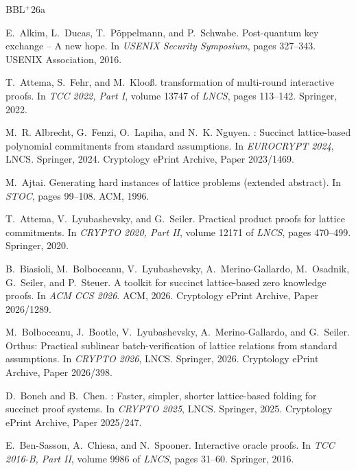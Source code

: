 \providecommand{\etalchar}[1]{$^{#1}$}
\begin{thebibliography}{BBL{\etalchar{+}}26a}
\small

E.~Alkim, L.~Ducas, T.~P{\"o}ppelmann, and P.~Schwabe.
\newblock Post-quantum key exchange -- A new hope.
\newblock In {\em USENIX Security Symposium}, pages 327--343. USENIX Association, 2016.

T.~Attema, S.~Fehr, and M.~Kloo{\ss}.
 transformation of multi-round interactive proofs.
\newblock In {\em TCC 2022, Part I}, volume 13747 of {\em LNCS}, pages 113--142. Springer, 2022.

M.~R. Albrecht, G.~Fenzi, O.~Lapiha, and N.~K. Nguyen.
: Succinct lattice-based polynomial commitments from standard assumptions.
\newblock In {\em EUROCRYPT 2024}, LNCS. Springer, 2024.
\newblock Cryptology ePrint Archive, Paper 2023/1469.

M.~Ajtai.
\newblock Generating hard instances of lattice problems (extended abstract).
\newblock In {\em STOC}, pages 99--108. ACM, 1996.

T.~Attema, V.~Lyubashevsky, and G.~Seiler.
\newblock Practical product proofs for lattice commitments.
\newblock In {\em CRYPTO 2020, Part II}, volume 12171 of {\em LNCS}, pages 470--499. Springer, 2020.

\bibitem[BBL{\etalchar{+}}26a]{BBLMOSS26}
B.~Biasioli, M.~Bolboceanu, V.~Lyubashevsky, A.~Merino-Gallardo, M.~Osadnik, G.~Seiler, and P.~Steuer.
\newblock A toolkit for succinct lattice-based zero knowledge proofs.
\newblock In {\em ACM CCS 2026}. ACM, 2026.
\newblock Cryptology ePrint Archive, Paper 2026/1289.

\bibitem[BBL{\etalchar{+}}26b]{BBLMS26}
M.~Bolboceanu, J.~Bootle, V.~Lyubashevsky, A.~Merino-Gallardo, and G.~Seiler.
\newblock Orthus: Practical sublinear batch-verification of lattice relations from standard assumptions.
\newblock In {\em CRYPTO 2026}, LNCS. Springer, 2026.
\newblock Cryptology ePrint Archive, Paper 2026/398.

D.~Boneh and B.~Chen.
: Faster, simpler, shorter lattice-based folding for succinct proof systems.
\newblock In {\em CRYPTO 2025}, LNCS. Springer, 2025.
\newblock Cryptology ePrint Archive, Paper 2025/247.

E.~Ben-Sasson, A.~Chiesa, and N.~Spooner.
\newblock Interactive oracle proofs.
\newblock In {\em TCC 2016-B, Part II}, volume 9986 of {\em LNCS}, pages 31--60. Springer, 2016.


\end{thebibliography}
